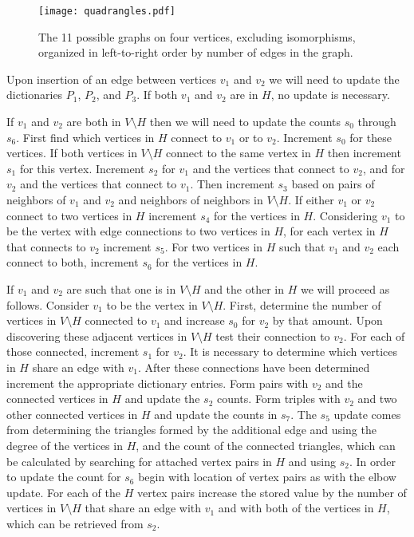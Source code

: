 \documentclass[11pt]{article}
\begin{document}
\begin{figure}
\vspace{-24pt}
\begin{center}
\texttt{[image: quadrangles.pdf]}
\end{center}
\vspace{-24pt}
\caption{The 11 possible graphs on four vertices, excluding 
isomorphisms, organized in left-to-right order by number of edges in the graph.}
\label{fig-quadrangles}
\end{figure}




Upon insertion of an edge between vertices $v_1$ and $v_2$ we will need to update the dictionaries $P_1$, $P_2$, and $P_3$. If both $v_1$ and $v_2$ are in $H$, no update is necessary.


If $v_1$ and $v_2$ are both in $V \setminus H$ then we will need to update the counts $s_0$ through $s_6$.  First find which vertices in $H$ connect to $v_1$ or to $v_2$.  Increment $s_0$ for these vertices.  If both vertices in $V \setminus H$ connect to the same vertex in $H$ then increment $s_1$ for this vertex.  Increment $s_2$ for $v_1$ and the vertices that connect to $v_2$, and for $v_2$ and the vertices that connect to $v_1$.  Then increment $s_3$ based on pairs of neighbors of $v_1$ and $v_2$ and neighbors of neighbors in $V \setminus H$.  If either $v_1$ or $v_2$ connect to two vertices in $H$ increment $s_4$ for the vertices in $H$.  Considering $v_1$ to be the vertex with edge connections to two vertices in $H$, for each vertex in $H$ that connects to $v_2$ increment $s_5$.  For two vertices in $H$ such that $v_1$ and $v_2$ each connect to both, increment $s_6$ for the vertices in $H$.  

If $v_1$ and $v_2$ are such that one is in $V \setminus H$ and the other in $H$ we will proceed as follows.  Consider $v_1$ to be the vertex in $V \setminus H$. First, determine the number of vertices in $V \setminus H$ connected to $v_1$ and increase $s_0$ for $v_2$ by that amount.  Upon discovering these adjacent vertices in $V \setminus H$ test their connection to $v_2$.  For each of those connected, increment $s_1$ for $v_2$.  It is necessary to determine which vertices in $H$ share an edge with $v_1$.  After these connections have been determined increment the appropriate dictionary entries.  Form pairs with $v_2$ and the connected vertices in $H$ and update the $s_2$ counts.  Form triples with $v_2$ and two other connected vertices in $H$ and update the counts in $s_7$. The $s_5$ update comes from determining the triangles formed by the additional edge and using the degree of the vertices in $H$, and the count of the connected triangles, which can be calculated by searching for attached vertex pairs in $H$ and using $s_2$. In order to update the count for $s_6$ begin with location of vertex pairs as with the elbow update.  For each of the $H$ vertex pairs increase the stored value by the number of vertices in $V \setminus H$ that share an edge with $v_1$ and with both of the vertices in $H$, which can be retrieved from $s_2$.
\end{document}
